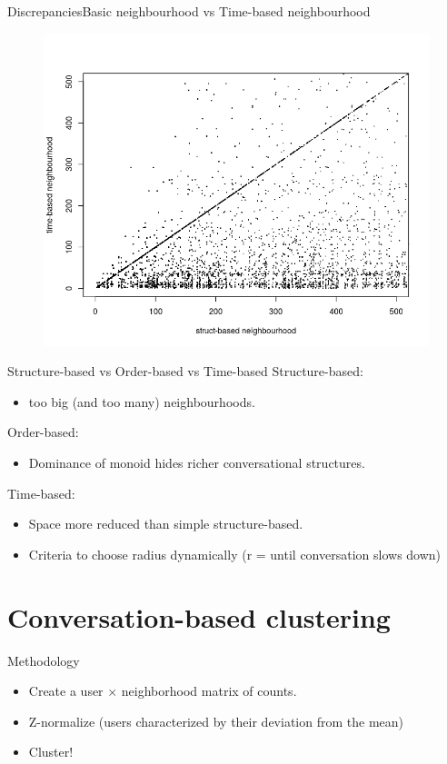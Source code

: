 \documentclass{beamer}
\begin{document}
\begin{frame}{Discrepancies}{Basic neighbourhood vs Time-based neighbourhood}
	\begin{figure}
		\centering
		\includegraphics[width=1\textwidth]{confusion_struct_time}
	\end{figure}
\end{frame}


\begin{frame}{Structure-based vs Order-based vs Time-based}
Structure-based:
\begin{itemize}
\item  too big (and too many) neighbourhoods.
\end{itemize}
Order-based:
\begin{itemize}
\item  Dominance of monoid hides richer conversational structures.
\end{itemize}
Time-based:
\begin{itemize}
\item Space more reduced than simple structure-based.
\item Criteria to choose radius dynamically (r = until conversation slows down)
\end{itemize}
\end{frame}

\section{Conversation-based clustering}
\begin{frame}{Methodology}
	\begin{itemize}
	\item Create a user $\times$ neighborhood matrix of counts.
	\item Z-normalize (users characterized by their deviation from the mean)
	\item Cluster!
\end{itemize}
\end{frame}
\end{document}
